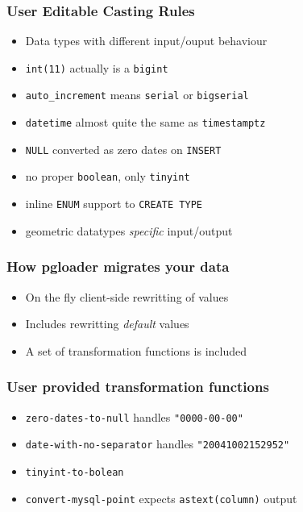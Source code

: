 \documentclass{beamer}
\begin{document}
\begin{frame}[fragile]
  \frametitle{User Editable Casting Rules}
  
  \vfill

  \begin{itemize}
  \item Data types with different input/ouput behaviour
  \item \texttt{int(11)} actually is a \texttt{bigint}
  \item \texttt{auto\_increment} means \texttt{serial} or \texttt{bigserial}
  \item \texttt{datetime} almost quite the same as \texttt{timestamptz}
  \item \texttt{NULL} converted as zero dates on \texttt{INSERT}
  \item no proper \texttt{boolean}, only \texttt{tinyint}
  \item inline \texttt{ENUM} support to \texttt{CREATE TYPE}
  \item geometric datatypes \textit{specific} input/output
  \end{itemize}
\end{frame}

\begin{frame}[fragile]
  \frametitle{How pgloader migrates your data}
  
  \vfill

  \begin{itemize}
  \item On the fly client-side rewritting of values
  \item Includes rewritting \textit{default} values
  \item A set of transformation functions is included
  \end{itemize}
\end{frame}

\begin{frame}[fragile]
  \frametitle{User provided transformation functions}
  
  \vfill

  \begin{itemize}
  \item \texttt{zero-dates-to-null} handles \texttt{"0000-00-00"}
  \item \texttt{date-with-no-separator} handles \texttt{"20041002152952"}
  \item \texttt{tinyint-to-bolean}
  \item \texttt{convert-mysql-point} expects \texttt{astext(column)} output
  \end{itemize}
\end{frame}
\end{document}
